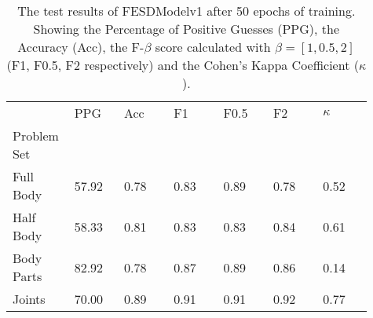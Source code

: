     \begin{table}[!htbp]
        \caption[Test Results of FESDModelv1]{The test results of FESDModelv1 after 50 epochs of training. Showing the Percentage of Positive Guesses (PPG), the Accuracy (Acc), the F-$\beta$ score calculated with $\beta = [1, 0.5, 2]$ (F1, F0.5, F2 respectively) and the Cohen's Kappa Coefficient ($\kappa$).}
        \label{tab:res_v1}
        \begin{tabular}{p{0.13\linewidth}p{0.13\linewidth}p{0.13\linewidth}p{0.13\linewidth}p{0.13\linewidth}p{0.13\linewidth}p{0.13\linewidth}}
\hline
{} &   PPG &  Acc &   F1 &  F0.5 &   F2 &  $\kappa$ \\
Problem Set   &       &      &      &       &      &           \\
\hline
Full Body  & 57.92 & 0.78 & 0.83 &  0.89 & 0.78 &      0.52 \\
Half Body  & 58.33 & 0.81 & 0.83 &  0.83 & 0.84 &      0.61 \\
Body Parts & 82.92 & 0.78 & 0.87 &  0.89 & 0.86 &      0.14 \\
Joints     & 70.00 & 0.89 & 0.91 &  0.91 & 0.92 &      0.77 \\
\hline
\end{tabular}

    \end{table}
  